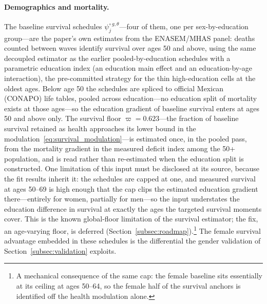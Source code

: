 \documentclass[12pt,a4paper]{article}
\begin{document}
\paragraph{Demographics and mortality.}
The baseline survival schedules $\psi^{\circ\, g,\theta}_j$---four of them, one per sex-by-education group---are the paper's own estimates from the ENASEM/MHAS panel: deaths counted between waves identify survival over ages 50 and above, using the same decoupled estimator as the earlier pooled-by-education schedules with a parametric education index (an education main effect and an education-by-age interaction), the pre-committed strategy for the thin high-education cells at the oldest ages. Below age 50 the schedules are spliced to official Mexican (CONAPO) life tables, pooled across education---no education split of mortality exists at those ages---so the education gradient of baseline survival enters at ages 50 and above only. The survival floor $\varpi=0.623$---the fraction of baseline survival retained as health approaches its lower bound in the modulation~\eqref{eq:survival_modulation}---is estimated once, in the pooled pass, from the mortality gradient in the measured deficit index among the 50+ population, and is read rather than re-estimated when the education split is constructed. One limitation of this input must be disclosed at its source, because the fit results inherit it: the schedules are capped at one, and measured survival at ages 50--69 is high enough that the cap clips the estimated education gradient there---entirely for women, partially for men---so the input understates the education difference in survival at exactly the ages the targeted survival moments cover. This is the known global-floor limitation of the survival estimator; the fix, an age-varying floor, is deferred (Section~\ref{subsec:roadmap}).\footnote{A mechanical consequence of the same cap: the female baseline sits essentially at its ceiling at ages 50--64, so the female half of the survival anchors is identified off the health modulation alone.} The female survival advantage embedded in these schedules is the differential the gender validation of Section~\ref{subsec:validation} exploits.
\end{document}
